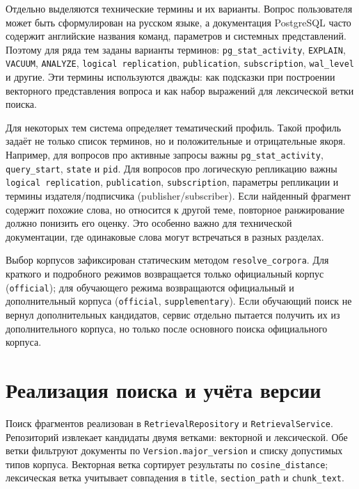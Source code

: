 Отдельно выделяются технические термины и их варианты. Вопрос пользователя может быть сформулирован на русском языке, а документация PostgreSQL часто содержит английские названия команд, параметров и системных представлений. Поэтому для ряда тем заданы варианты терминов: \texttt{pg\_stat\_activity}, \texttt{EXPLAIN}, \texttt{VACUUM}, \texttt{ANALYZE}, \texttt{logical replication}, \texttt{publication}, \texttt{subscription}, \texttt{wal\_level} и другие. Эти термины используются дважды: как подсказки при построении векторного представления вопроса и как набор выражений для лексической ветки поиска.

Для некоторых тем система определяет тематический профиль. Такой профиль задаёт не только список терминов, но и положительные и отрицательные якоря. Например, для вопросов про активные запросы важны \texttt{pg\_stat\_activity}, \texttt{query\_start}, \texttt{state} и \texttt{pid}. Для вопросов про логическую репликацию важны \texttt{logical replication}, \texttt{publication}, \texttt{subscription}, параметры репликации и термины издателя/подписчика (publisher/subscriber). Если найденный фрагмент содержит похожие слова, но относится к другой теме, повторное ранжирование должно понизить его оценку. Это особенно важно для технической документации, где одинаковые слова могут встречаться в разных разделах.

Выбор корпусов зафиксирован статическим методом \texttt{resolve\_corpora}. Для краткого и подробного режимов возвращается только официальный корпус (\texttt{official}); для обучающего режима возвращаются официальный и дополнительный корпуса (\texttt{official}, \texttt{supplementary}). Если обучающий поиск не вернул дополнительных кандидатов, сервис отдельно пытается получить их из дополнительного корпуса, но только после основного поиска официального корпуса.

\section{Реализация поиска и учёта версии}

Поиск фрагментов реализован в \texttt{RetrievalRepository} и \texttt{RetrievalService}. Репозиторий извлекает кандидаты двумя ветками: векторной и лексической. Обе ветки фильтруют документы по \texttt{Version.major\_version} и списку допустимых типов корпуса. Векторная ветка сортирует результаты по \texttt{cosine\_distance}; лексическая ветка учитывает совпадения в \texttt{title}, \texttt{section\_path} и \texttt{chunk\_text}.

